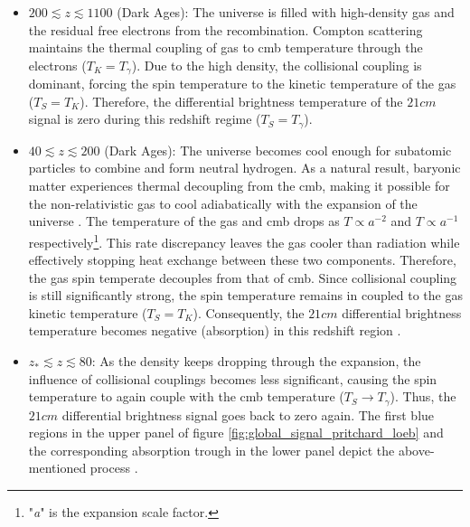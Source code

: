 \documentclass[12pt, TexShade, letterpaper]{report}
\begin{document}
\begin{itemize}
\item $200 \lesssim z \lesssim 1100$ (Dark Ages): The universe is filled with high-density gas and the residual free electrons from the recombination. Compton scattering maintains the thermal coupling of gas to \gls{cmb} temperature through the electrons ($T_K = T_\gamma$). Due to the high density, the collisional coupling is dominant, forcing the spin temperature to the kinetic temperature of the gas ($T_S = T_K$). 
Therefore, the differential brightness temperature of the $21cm$ signal is zero during this redshift regime ($T_S = T_\gamma$)\cite{21century}.\par

\item $40 \lesssim z \lesssim 200$ (Dark Ages): The universe becomes cool enough for subatomic particles to combine and form neutral hydrogen. As a natural result, baryonic matter experiences thermal decoupling from the \gls{cmb}, making it possible for the non-relativistic gas to cool adiabatically with the expansion of the universe \cite{21century}. The temperature of the gas and \gls{cmb} drops as $T\propto a^{-2}$ and $T\propto a^{-1}$ respectively\footnote{"\emph{a}" is the expansion scale factor.}. This rate discrepancy leaves the gas cooler than radiation while effectively stopping heat exchange between these two components. Therefore, the gas spin temperate decouples from that of \gls{cmb}. Since collisional coupling is still significantly strong, the spin temperature remains in coupled to the gas kinetic temperature ($T_S = T_K$). Consequently, the $21cm$ differential brightness temperature becomes negative (absorption) in this redshift region \cite{map_universe, 21century}.\par

\item $z_* \lesssim z \lesssim 80$: As the density keeps dropping through the expansion, the influence of collisional couplings becomes less significant, causing the spin temperature to again couple with the \gls{cmb} temperature ($T_S \rightarrow T_\gamma$). Thus, the $21cm$ differential brightness signal goes back to zero again\cite{map_universe}. The first blue regions in the upper panel of figure \ref{fig:global_signal_pritchard_loeb} and the corresponding absorption trough in the lower panel depict the above-mentioned process \cite{map_universe, 21century}.\par


\end{itemize}
\end{document}
